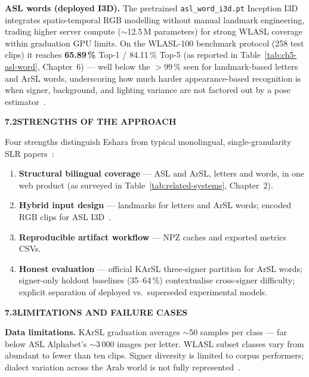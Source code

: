 \noindent\textbf{ASL words (deployed I3D).} The pretrained \texttt{asl\_word\_i3d.pt} Inception I3D integrates spatio-temporal RGB modelling without manual landmark engineering, trading higher server compute ($\sim$12.5\,M parameters) for strong WLASL coverage within graduation GPU limits. On the WLASL-100 benchmark protocol (258 test clips) it reaches \textbf{65.89\,\%} Top-1 / 84.11\,\% Top-5 (as reported in Table~\ref{tab:ch5-asl-word}, Chapter~6) --- well below the $>$99\,\% seen for landmark-based letters and ArSL words, underscoring how much harder appearance-based recognition is when signer, background, and lighting variance are not factored out by a pose estimator~\cite{li2020wlasl}.\par\vspace{0.3cm}
\clearpage
\noindent\textbf{7.2\quad STRENGTHS OF THE APPROACH}\par
{}
\vspace{0.2cm}

\noindent Four strengths distinguish Eshara from typical monolingual, single-granularity SLR papers~\cite{rastgoo2021survey}:
\begin{enumerate}
\item \textbf{Structural bilingual coverage} --- ASL and ArSL, letters and words, in one web product (as surveyed in Table~\ref{tab:related-systems}, Chapter~2).
\item \textbf{Hybrid input design} --- landmarks for letters and ArSL words; encoded RGB clips for ASL I3D~\cite{zhang2020mediapipe,li2020wlasl}.
\item \textbf{Reproducible artifact workflow} --- NPZ caches and exported metrics CSVs.
\item \textbf{Honest evaluation} --- official KArSL three-signer partition for ArSL words; signer-only holdout baselines (35--64\,\%) contextualise cross-signer difficulty; explicit separation of deployed vs.\ superseded experimental models.
\end{enumerate}
\vspace{0.3cm}

\noindent\textbf{7.3\quad LIMITATIONS AND FAILURE CASES}\par
{}
\vspace{0.2cm}

\noindent\textbf{Data limitations.} KArSL graduation averages $\sim$50 samples per class --- far below ASL Alphabet's $\sim$3\,000 images per letter. WLASL subset classes vary from abundant to fewer than ten clips. Signer diversity is limited to corpus performers; dialect variation across the Arab world is not fully represented~\cite{sidig2021karsl,li2020wlasl}.\par\vspace{0.2cm}

